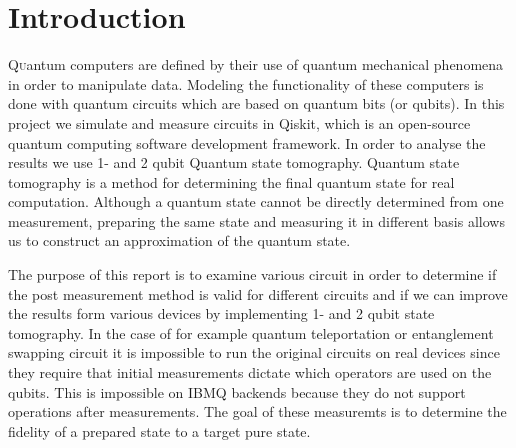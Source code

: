 \section{Introduction}

\lettrine[nindent=0em,lines=3]{Q}uantum computers are defined by their use of quantum mechanical phenomena in order to manipulate data. Modeling the functionality of these computers is done with quantum circuits which are based on quantum bits (or qubits). In this project we simulate and measure circuits in Qiskit, which is an open-source quantum computing software development framework. In order to analyse the results we use 1- and 2 qubit Quantum state tomography. Quantum state tomography is a method for determining the final quantum state for real computation. Although a quantum state cannot be directly determined from one measurement, preparing the same state and measuring it in different basis allows us to construct an approximation of the quantum state.

The purpose of this report is to examine various circuit in order to determine if the post measurement method is valid for different circuits and if we can improve the results form various devices by implementing 1- and 2 qubit state tomography. In the case of for example quantum teleportation or entanglement swapping circuit it is impossible to run the original circuits on real devices since they require that initial measurements dictate which operators are used on the qubits. This is impossible on IBMQ backends because they do not support operations after measurements. The goal of these measuremts is to determine the fidelity of a prepared state to a target pure state.

\cite{nielsen10_quant}
